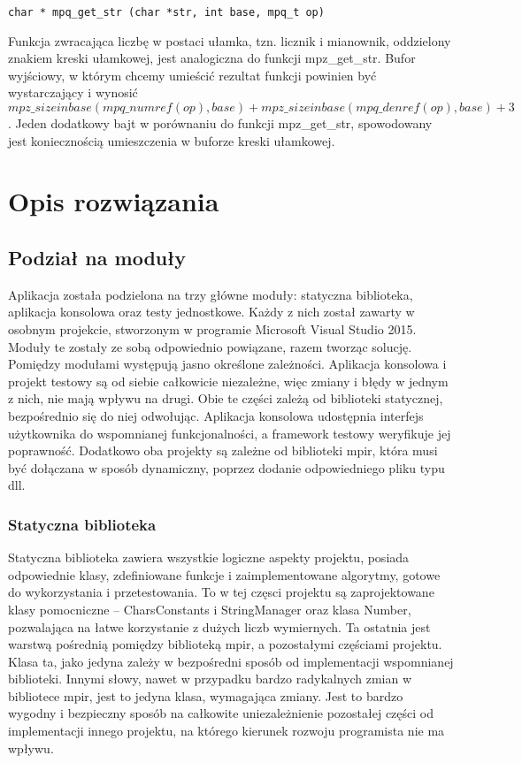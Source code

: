 \documentclass[twoside,a4paper]{book}
\begin{document}
\begin{lstlisting}
char * mpq_get_str (char *str, int base, mpq_t op)
\end{lstlisting}

Funkcja zwracająca liczbę w postaci ułamka, tzn. licznik i mianownik, oddzielony znakiem kreski ułamkowej, jest analogiczna do funkcji mpz\_get\_str. Bufor wyjściowy, w którym chcemy umieścić rezultat funkcji powinien być wystarczający i wynosić $mpz\_sizeinbase(mpq\_numref(op), \allowbreak base) + mpz\_sizeinbase (mpq\_denref(op), base) + 3$. Jeden dodatkowy bajt w porównaniu do funkcji mpz\_get\_str, spowodowany jest koniecznością umieszczenia w buforze kreski ułamkowej.


\chapter{Opis rozwiązania}
\section{Podział na moduły}

Aplikacja została podzielona na trzy główne moduły: statyczna biblioteka, aplikacja konsolowa oraz testy jednostkowe. Każdy z nich został zawarty w osobnym projekcie, stworzonym w programie Microsoft Visual Studio 2015. Moduły te zostały ze sobą odpowiednio powiązane, razem tworząc solucję. Pomiędzy modułami występują jasno określone zależności. Aplikacja konsolowa i projekt testowy są od siebie całkowicie niezależne, więc zmiany i błędy w jednym z nich, nie mają wpływu na drugi. Obie te części zależą od biblioteki statycznej, bezpośrednio się do niej odwołując. Aplikacja konsolowa udostępnia interfejs użytkownika do wspomnianej funkcjonalności, a framework testowy weryfikuje jej poprawność. Dodatkowo oba projekty są zależne od biblioteki mpir, która musi być dołączana w sposób dynamiczny, poprzez dodanie odpowiedniego pliku typu dll. 

\subsection{Statyczna biblioteka}

Statyczna biblioteka zawiera wszystkie logiczne aspekty projektu, posiada odpowiednie klasy, zdefiniowane funkcje i zaimplementowane algorytmy, gotowe do wykorzystania i przetestowania. To w tej częsci projektu są zaprojektowane klasy pomocniczne -- CharsConstants i StringManager oraz klasa Number, pozwalająca na łatwe korzystanie z dużych liczb wymiernych. Ta ostatnia jest warstwą pośrednią pomiędzy biblioteką mpir, a pozostałymi częściami projektu. Klasa ta, jako jedyna zależy w bezpośredni sposób od implementacji wspomnianej biblioteki. Innymi słowy, nawet w przypadku bardzo radykalnych zmian w bibliotece mpir, jest to jedyna klasa, wymagająca zmiany. Jest to bardzo wygodny i bezpieczny sposób na całkowite uniezależnienie pozostałej części od implementacji innego projektu, na którego kierunek rozwoju programista nie ma wpływu.
\end{document}
